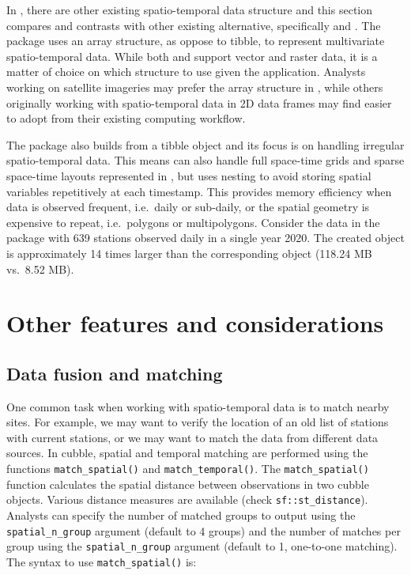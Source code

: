 \documentclass[
  shortnames]{jss}
\begin{document}
In , there are other existing spatio-temporal data structure and this section compares and contrasts  with other existing alternative, specifically  and . The  package \citep{stars} uses an array structure, as oppose to tibble, to represent multivariate spatio-temporal data. While both  and  support vector and raster data, it is a matter of choice on which structure to use given the application. Analysts working on satellite imageries may prefer the array structure in , while others originally working with spatio-temporal data in 2D data frames may find  easier to adopt from their existing computing workflow.

The  package \citep{sftime} also builds from a tibble object and its focus is on handling irregular spatio-temporal data. This means  can also handle full space-time grids and sparse space-time layouts represented in , but  uses nesting to avoid storing spatial variables repetitively at each timestamp. This provides memory efficiency when data is observed frequent, i.e.~daily or sub-daily, or the spatial geometry is expensive to repeat, i.e.~polygons or multipolygons. Consider the  data in the  package with 639 stations observed daily in a single year 2020. The created  object is approximately 14 times larger than the corresponding  object (118.24 MB vs.~8.52 MB).

\hypertarget{others}{%
\section{Other features and considerations}\label{others}}

\hypertarget{matching}{%
\subsection{Data fusion and matching}\label{matching}}

One common task when working with spatio-temporal data is to match nearby sites. For example, we may want to verify the location of an old list of stations with current stations, or we may want to match the data from different data sources. In cubble, spatial and temporal matching are performed using the functions \texttt{match\_spatial()} and \texttt{match\_temporal()}. The \texttt{match\_spatial()} function calculates the spatial distance between observations in two cubble objects. Various distance measures are available (check \texttt{sf::st\_distance}). Analysts can specify the number of matched groups to output using the \texttt{spatial\_n\_group} argument (default to 4 groups) and the number of matches per group using the \texttt{spatial\_n\_group} argument (default to 1, one-to-one matching). The syntax to use \texttt{match\_spatial()} is:
\end{document}
